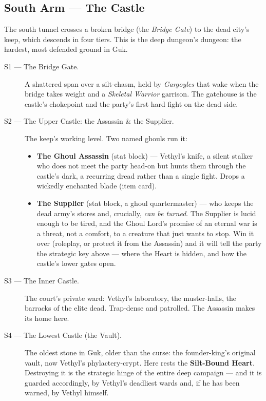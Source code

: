 \documentclass[10pt,twoside]{report}
\begin{document}
\subsection*{South Arm --- The Castle}
The south tunnel crosses a broken bridge (the \emph{Bridge Gate}) to the dead city's keep, which descends in four tiers. This is the deep dungeon's dungeon: the hardest, most defended ground in Guk.
\begin{description}
\item[S1 --- The Bridge Gate.] A shattered span over a silt-chasm, held by \emph{Gargoyles} that wake when the bridge takes weight and a \emph{Skeletal Warrior} garrison. The gatehouse is the castle's chokepoint and the party's first hard fight on the dead side.
\item[S2 --- The Upper Castle: the Assassin \& the Supplier.] The keep's working level. Two named ghouls run it:
  \begin{itemize}
  \item \textbf{The Ghoul Assassin} (stat block) --- Vethyl's knife, a silent stalker who does not meet the party head-on but hunts them through the castle's dark, a recurring dread rather than a single fight. Drops a wickedly enchanted blade (item card).
  \item \textbf{The Supplier} (stat block, a ghoul quartermaster) --- who keeps the dead army's stores and, crucially, \emph{can be turned}. The Supplier is lucid enough to be tired, and the Ghoul Lord's promise of an eternal war is a threat, not a comfort, to a creature that just wants to stop. Win it over (roleplay, or protect it from the Assassin) and it will tell the party the strategic key above --- where the Heart is hidden, and how the castle's lower gates open.
  \end{itemize}
\item[S3 --- The Inner Castle.] The court's private ward: Vethyl's laboratory, the muster-halls, the barracks of the elite dead. Trap-dense and patrolled. The Assassin makes its home here.
\item[S4 --- The Lowest Castle (the Vault).] The oldest stone in Guk, older than the curse: the founder-king's original vault, now Vethyl's phylactery-crypt. Here rests the \textbf{Silt-Bound Heart}. Destroying it is the strategic hinge of the entire deep campaign --- and it is guarded accordingly, by Vethyl's deadliest wards and, if he has been warned, by Vethyl himself.
\end{description}

\end{document}
